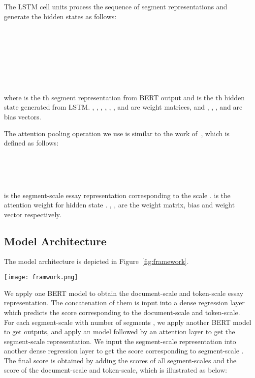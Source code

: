 \documentclass[11pt]{article}
\begin{document}
The LSTM cell units process the sequence of segment representations and generate the hidden states as follows:

\begin{center}
\label{eq:lstm_it}
 \\
\label{eq:lstm_ft}
  \\
\label{eq:lstm_ct_hat}
  \\
\label{eq:lstm_ct}
  \\
\label{eq:lstm_ot}
 \\
\label{eq:lstm_ht}
  \\
\end{center}



 where  is the {th} segment representation from BERT  output and  is the th hidden state generated from LSTM. , , , , , ,  and  are weight matrices, and , , , and  are bias vectors. 
 
 The attention pooling operation we use is similar to the work of~\citep{Dong:2017}, which is defined as follows:

\begin{center}
\label{eq:atten_alpha_hat}
 \\
\label{eq:atten_alpha}
 \\
\label{eq:atten_o}
 \\
\end{center}

  is the segment-scale essay representation corresponding to the scale .
  is the attention weight for hidden state .
 , ,  are the weight matrix, bias and weight vector respectively.


\subsection{Model Architecture}
The model architecture is depicted in Figure~\ref{fig:framework}.


\begin{figure*}[ht]
\centering
\texttt{[image: framwork.png]}
\caption{
The proposed automated essay scoring architecture based on multi-scale essay representation.
The left part illustrates the document-scale and token-scale essay representation and scoring module,
and the right part illustrates  segment-scale essay representations and scoring modules.}
\label{fig:framework}
\end{figure*}

We apply one BERT model to obtain the document-scale and token-scale essay representation.
The concatenation of them is input into a dense regression layer which predicts the score corresponding to the document-scale and token-scale.
For each segment-scale  with number of segments , we apply another BERT model to get   outputs, and apply an  model followed by an attention layer to get the segment-scale representation.
We input the segment-scale representation into another dense regression layer to get the score corresponding to segment-scale .
The final score is obtained by adding the scores of all  segment-scales and the score of the document-scale and token-scale, which is illustrated as below:
\end{document}
